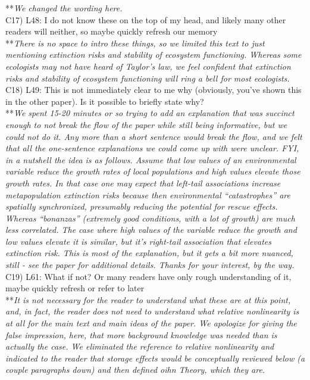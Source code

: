 \documentclass[letterpaper,11pt]{article}
\begin{document}
\noindent ***\emph{We changed the wording here.} \\

\noindent C17) L48: I do not know these on the top of my head, and likely many other readers will neither, so maybe quickly refresh our memory \\

\noindent ***\emph{There is no space to intro these things, so we limited this text to just mentioning 
extinction risks and stability of ecosystem functioning. Whereas some ecologists may not have heard of 
Taylor's law, we feel confident that extinction risks and stability of ecosystem functioning will ring
a bell for most ecologists.} \\

\noindent C18) L49: This is not immediately clear to me why (obviously, you’ve shown this in the other paper). Is it possible to briefly state why? \\

\noindent ***\emph{We spent 15-20 minutes or so trying to add an explanation that was succinct enough to not break
the flow of the paper while still being informative, but we could not do it. Any more than a short sentence would break the 
flow, and we felt that all the one-sentence explanations we could come up with were unclear. 
FYI, in a nutshell the idea is as follows. Assume that low values of an environmental variable reduce the 
growth rates of local populations and high values elevate those growth rates. In that case one may
expect that left-tail associations increase metapopulation extinction risks because then environmental
``catastrophes'' are spatially synchronized, presumably reducing the potential for rescue effects. Whereas
``bonanzas'' (extremely good conditions, with a lot of growth) are much less correlated. The case where
high values of the variable reduce the growth and low values elevate it is similar, but it's right-tail association
that elevates extinction risk. This is most of the explanation, but it gets a bit more nuanced, still - 
see the paper for additional details. Thanks for your interest, by the way.} \\

\noindent C19) L61: What if not? Or many readers have only rough understanding of it, maybe quickly refresh or refer to later \\

\noindent ***\emph{It is not necessary for the reader to understand what these are at this point, and,
in fact, the reader does not need to understand what relative nonlinearity is at all for the main text
and main ideas of the paper. We apologize for giving the false impression, here, that more background knowledge was needed
than is actually the case. We eliminated the reference to relative nonlinearity and indicated to the 
reader that storage effects would be conceptually reviewed below (a couple paragraphs down) and then 
defined oihn Theory, which they are.} \\
\end{document}
